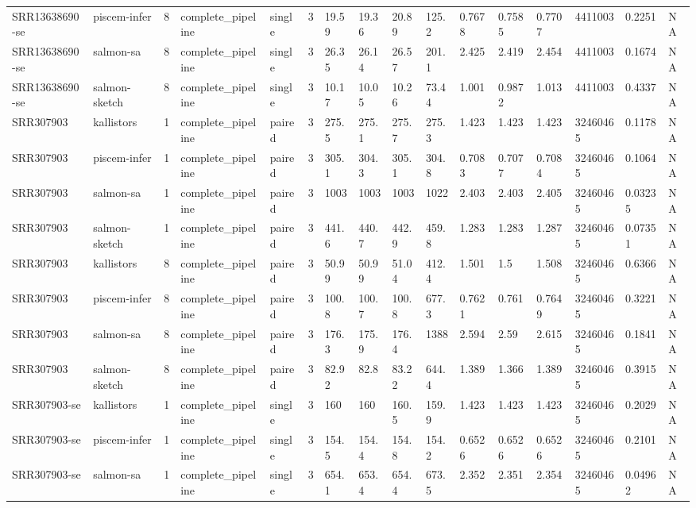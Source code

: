 \begin{tabular}{llllllllllllllll}
SRR13638690-se & piscem-infer & 8 & complete\_pipeline & single & 3 & 19.59 & 19.36 & 20.89 & 125.2 & 0.7678 & 0.7585 & 0.7707 & 4411003 & 0.2251 & NA \\
SRR13638690-se & salmon-sa & 8 & complete\_pipeline & single & 3 & 26.35 & 26.14 & 26.57 & 201.1 & 2.425 & 2.419 & 2.454 & 4411003 & 0.1674 & NA \\
SRR13638690-se & salmon-sketch & 8 & complete\_pipeline & single & 3 & 10.17 & 10.05 & 10.26 & 73.44 & 1.001 & 0.9872 & 1.013 & 4411003 & 0.4337 & NA \\
SRR307903 & kallistors & 1 & complete\_pipeline & paired & 3 & 275.5 & 275.1 & 275.7 & 275.3 & 1.423 & 1.423 & 1.423 & 32460465 & 0.1178 & NA \\
SRR307903 & piscem-infer & 1 & complete\_pipeline & paired & 3 & 305.1 & 304.3 & 305.1 & 304.8 & 0.7083 & 0.7077 & 0.7084 & 32460465 & 0.1064 & NA \\
SRR307903 & salmon-sa & 1 & complete\_pipeline & paired & 3 & 1003 & 1003 & 1003 & 1022 & 2.403 & 2.403 & 2.405 & 32460465 & 0.03235 & NA \\
SRR307903 & salmon-sketch & 1 & complete\_pipeline & paired & 3 & 441.6 & 440.7 & 442.9 & 459.8 & 1.283 & 1.283 & 1.287 & 32460465 & 0.07351 & NA \\
SRR307903 & kallistors & 8 & complete\_pipeline & paired & 3 & 50.99 & 50.99 & 51.04 & 412.4 & 1.501 & 1.5 & 1.508 & 32460465 & 0.6366 & NA \\
SRR307903 & piscem-infer & 8 & complete\_pipeline & paired & 3 & 100.8 & 100.7 & 100.8 & 677.3 & 0.7621 & 0.761 & 0.7649 & 32460465 & 0.3221 & NA \\
SRR307903 & salmon-sa & 8 & complete\_pipeline & paired & 3 & 176.3 & 175.9 & 176.4 & 1388 & 2.594 & 2.59 & 2.615 & 32460465 & 0.1841 & NA \\
SRR307903 & salmon-sketch & 8 & complete\_pipeline & paired & 3 & 82.92 & 82.8 & 83.22 & 644.4 & 1.389 & 1.366 & 1.389 & 32460465 & 0.3915 & NA \\
SRR307903-se & kallistors & 1 & complete\_pipeline & single & 3 & 160 & 160 & 160.5 & 159.9 & 1.423 & 1.423 & 1.423 & 32460465 & 0.2029 & NA \\
SRR307903-se & piscem-infer & 1 & complete\_pipeline & single & 3 & 154.5 & 154.4 & 154.8 & 154.2 & 0.6526 & 0.6526 & 0.6526 & 32460465 & 0.2101 & NA \\
SRR307903-se & salmon-sa & 1 & complete\_pipeline & single & 3 & 654.1 & 653.4 & 654.4 & 673.5 & 2.352 & 2.351 & 2.354 & 32460465 & 0.04962 & NA \\

\end{tabular}
